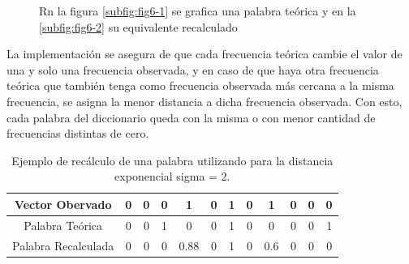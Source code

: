 \begin{figure}[ht]
	\centering
	\caption{Rn la figura \ref{subfig:fig6-1} se grafica una palabra teórica y en la \ref{subfig:fig6-2} su equivalente recalculado}
\end{figure}

La implementación se asegura de que cada frecuencia teórica cambie el valor de una y solo una frecuencia observada, y en caso de que haya otra frecuencia teórica que también tenga como frecuencia observada más cercana a la misma frecuencia, se asigna la menor distancia a dicha frecuencia observada. Con esto, cada palabra del diccionario queda con la misma o con menor cantidad de frecuencias distintas de cero.

\begin {table}[H]
\begin{center}
	\begin{tabular}{|c|c|c|c|c|c|c|c|c|c|c|c|}
		\hline Vector Obervado     & 0 & 0 &  0 &  1    & 0 &  1 & 0 & 1   & 0 & 0 & 0 \\ 
		\hline Palabra Teórica     & 0 & 0 &  1 &  0    & 0 &  1 & 0 & 0   & 0 & 0 & 1 \\ 
		\hline Palabra Recalculada & 0 & 0 &  0 &  0.88 & 0 &  1 & 0 & 0.6 & 0 & 0 & 0 \\ 
		\hline
	\end{tabular}
	\caption {Ejemplo de recálculo de una palabra utilizando para la distancia exponencial sigma = 2.}
\end{center}
\end{table}

